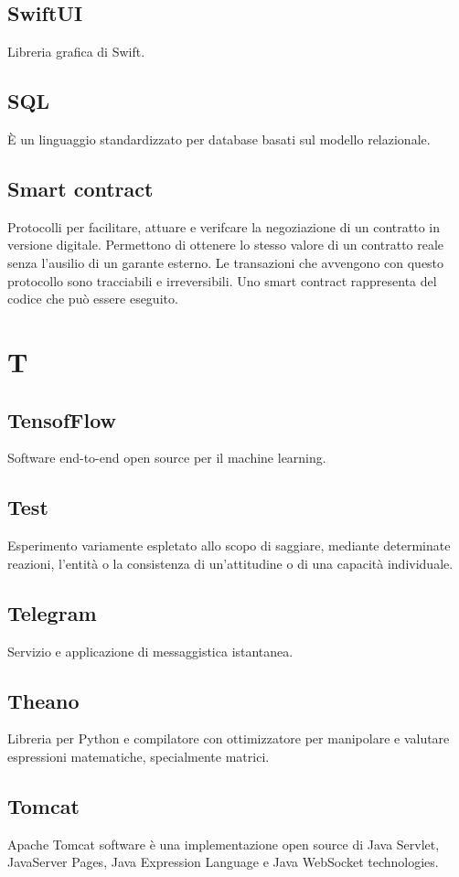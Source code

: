 \subsection{SwiftUI} Libreria grafica di Swift.
\subsection{SQL} È un linguaggio standardizzato per database basati sul modello relazionale.
\subsection{Smart contract} Protocolli per facilitare, attuare e verifcare la negoziazione di un contratto in versione digitale.
Permettono di ottenere lo stesso valore di un contratto reale senza l'ausilio di un garante esterno. Le transazioni che avvengono con questo protocollo sono tracciabili e irreversibili. Uno smart contract rappresenta del codice che può essere eseguito.
\newpage \section{T}
\subsection{TensofFlow} Software end-to-end open source per il machine learning.
\subsection{Test} Esperimento variamente espletato allo scopo di saggiare, mediante determinate reazioni, l'entità o la consistenza di un'attitudine o di una capacità individuale.
\subsection{Telegram} Servizio e applicazione di messaggistica istantanea.
\subsection{Theano} Libreria per Python e compilatore con ottimizzatore per manipolare e valutare espressioni matematiche, specialmente matrici.
\subsection{Tomcat} Apache Tomcat software è una implementazione open source di Java Servlet, JavaServer Pages, Java Expression Language e Java WebSocket technologies.
